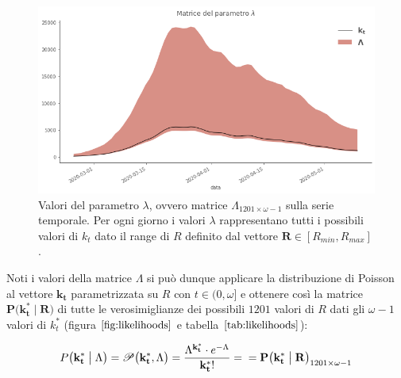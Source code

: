 \documentclass[11pt]{article}
\begin{document}
    
    
    \begin{figure}
    \centering
        \includegraphics{lambda.png}
        \caption{Valori del parametro $\lambda$, ovvero matrice $\Lambda_{1201 \times \omega-1}$ sulla serie temporale. Per ogni giorno i valori $\lambda$ rappresentano tutti i possibili valori di $k_t$ dato il range di $R$ definito dal vettore $\mathbf{R} \in [R_{min},R_{max}]$.}
        \label{fig:lambda}
    \end{figure}

    
    Noti i valori della matrice \(\Lambda\) si può dunque applicare la
distribuzione di Poisson al vettore \(\mathbf{k_t}\) parametrizzata su
\(R\) con \(t \in (0,\omega]\) e ottenere così la matrice
\(\mathbf{P\big(k_t^* \;\big|\; R\big)}\) di tutte le verosimiglianze
dei possibili \(1201\) valori di \(R\) dati gli \(\omega-1\) valori di
\(k_t^*\) (figura \(\ref{fig:likelihoods}\) e tabella
\(\ref{tab:likelihoods}\)):

    \begin{equation}\label{eq:matricepkr}
P\big( \mathbf{k_t^*} \; \big| \; \Lambda \big)
= \mathscr{P} \big( \mathbf{k_t^*}, \Lambda \big) = 
\frac{\Lambda^{\mathbf{k_t^*}} \cdot e^{-\Lambda}}{\mathbf{k_t^*}!} = \\
= \mathbf{P\big( k_t^* \;\big|\; R \big)}_{1201 \times \omega-1}
\end{equation}
\end{document}
